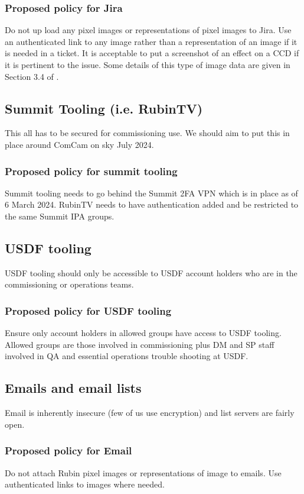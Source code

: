 \subsubsection{Proposed policy for Jira}
Do not up load any pixel images or representations of pixel images to Jira.
Use an authenticated link to any image rather than a representation of an image if it is needed in a ticket.
It is acceptable to put a screenshot of an effect on a CCD if it is pertinent to the issue.
Some details of this type of image data are given in Section 3.4 of .

\subsection{Summit Tooling (i.e. RubinTV)}
This all has to be secured for commissioning use.
We should aim to put this in place around ComCam on sky July 2024.

\subsubsection{Proposed policy for summit tooling}
Summit tooling needs to go behind the Summit 2FA VPN which is in place as of 6 March 2024.
RubinTV needs to have authentication added and be restricted to the same Summit IPA groups.

\subsection{USDF tooling}
USDF tooling should only be accessible to USDF account holders who are in the commissioning or operations teams.
\subsubsection{Proposed policy for USDF tooling}
Ensure only account holders in allowed groups have access to USDF tooling.
Allowed groups are those involved in commissioning plus DM and SP staff involved in QA and essential operations trouble shooting at USDF.

\subsection{Emails and email lists}
Email is inherently insecure (few of us use encryption) and list servers are fairly open.

\subsubsection{Proposed policy for Email}
Do not attach Rubin pixel images or representations of image to emails.
Use authenticated links to images where needed.

